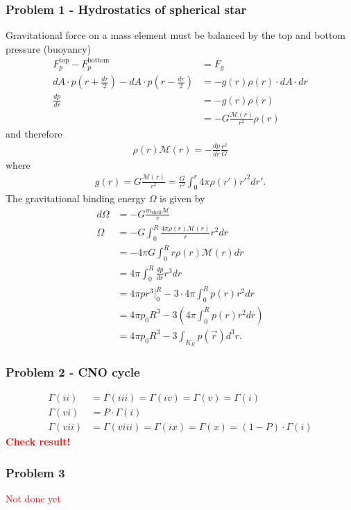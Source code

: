 \documentclass[10pt,a4paper]{article}
\theoremstyle{definition}
\begin{document}
\subsubsection{Problem 1 - Hydrostatics of spherical star}
Gravitational force on a mass element must be balanced by the top and bottom pressure (buoyancy)
\begin{align}
    F_p^\text{top}-F_p^\text{bottom}&=F_g\\
    dA\cdot p\left(r+\frac{dr}{2}\right)-dA\cdot p\left(r-\frac{dr}{2}\right)&=-g(r)\rho(r)\cdot dA\cdot dr\\
    \frac{dp}{dr} &=-g(r)\rho(r)\\
    &=-G\frac{\mathcal{M}(r)}{r^2}\rho(r)
\end{align}
and therefore
\begin{align}
   \rho(r)\mathcal{M}(r)=-\frac{dp}{dr}\frac{r^2}{G}
\end{align}
where
\begin{align}
    g(r)=G\frac{\mathcal{M}(r)}{r^2}=\frac{G}{r^2}\int_0^r4\pi\rho(r')r'^2dr'.
\end{align}
The gravitational binding energy $\Omega$ is given by
\begin{align}
    d\Omega&=-G\frac{m_\text{shell}\mathcal{M}}{r}\\
    \Omega&=-G\int_0^R\frac{4\pi\rho(r)\mathcal{M}(r)}{r}r^2dr\\
    &=-4\pi G\int_0^Rr\rho(r)\mathcal{M}(r)dr\\
    &=4\pi\int_0^R\frac{dp}{dr}r^3dr\\
    &=4\pi p r^3|_0^R - 3\cdot4\pi\int_0^Rp(r)r^2dr\\
    &=4\pi p_0 R^3 - 3\left(4\pi\int_0^Rp(r)r^2dr\right)\\
    &=4\pi p_0 R^3 - 3\int_{K_R}p(\vec{r})d^3r.
\end{align}
\subsubsection{Problem 2 - CNO cycle}
\begin{align}
    \Gamma(ii)&=\Gamma(iii)=\Gamma(iv)=\Gamma(v)=\Gamma(i)\\
    \Gamma(vi)&=P\cdot\Gamma(i)\\
    \Gamma(vii)&=\Gamma(viii)=\Gamma(ix)=\Gamma(x)=(1-P)\cdot\Gamma(i)
\end{align}
\textcolor{red}{\bf Check result!}

\subsubsection{Problem 3}
\textcolor{red}{Not done yet}
\end{document}
